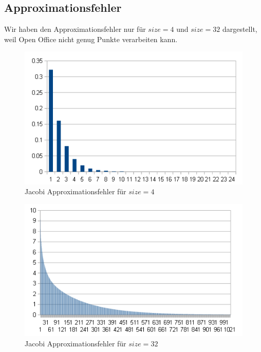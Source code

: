 \documentclass{article}
\begin{document}
\subsection{Approximationsfehler}
Wir haben den Approximationsfehler nur für $size=4$ und $size=32$ dargestellt, weil Open Office nicht genug Punkte verarbeiten kann.
\begin{figure}[htbp] 
  \centering
     \includegraphics[width=1\textwidth]{bilder/dj4.png}
  \caption{Jacobi Approximationsfehler für $size=4$}
  \label{fig:Bild2}
\end{figure}
\begin{figure}[htbp] 
  \centering
     \includegraphics[width=1\textwidth]{bilder/dj32.png}
  \caption{Jacobi Approximationsfehler für $size=32$}
  \label{fig:Bild3}
\end{figure}
\end{document}
